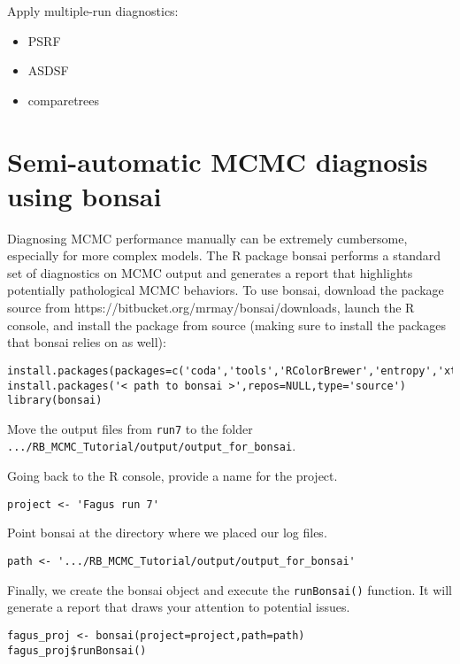 Apply multiple-run diagnostics:
\begin{itemize}
\item{PSRF}
\item{ASDSF}
\item{comparetrees}
\end{itemize}

	
	

\bigskip
\section{Semi-automatic MCMC diagnosis using bonsai}

Diagnosing MCMC performance manually can be extremely cumbersome, especially for more complex models.
The R package bonsai performs a standard set of diagnostics on MCMC output and generates a report that highlights potentially pathological MCMC behaviors.
To use bonsai, download the package source from https://bitbucket.org/mrmay/bonsai/downloads, launch the R console, and install the package from source (making sure to install the packages that bonsai relies on as well):
{\tt \begin{snugshade*}
\begin{lstlisting}
install.packages(packages=c('coda','tools','RColorBrewer','entropy','xtable'),dependencies=TRUE)
install.packages('< path to bonsai >',repos=NULL,type='source')
library(bonsai)
\end{lstlisting}
\end{snugshade*}}

Move the output files from \texttt{run7} to the folder \verb!.../RB_MCMC_Tutorial/output/output_for_bonsai!.

Going back to the R console, provide a name for the project.
{\tt \begin{snugshade*}
\begin{lstlisting}
project <- 'Fagus run 7'
\end{lstlisting}
\end{snugshade*}}

Point bonsai at the directory where we placed our log files.
{\tt \begin{snugshade*}
\begin{lstlisting}
path <- '.../RB_MCMC_Tutorial/output/output_for_bonsai'
\end{lstlisting}
\end{snugshade*}}

Finally, we create the bonsai object and execute the \texttt{runBonsai()} function.
It will generate a report that draws your attention to potential issues.
{\tt \begin{snugshade*}
\begin{lstlisting}
fagus_proj <- bonsai(project=project,path=path)
fagus_proj$runBonsai()
\end{lstlisting}
\end{snugshade*}}

